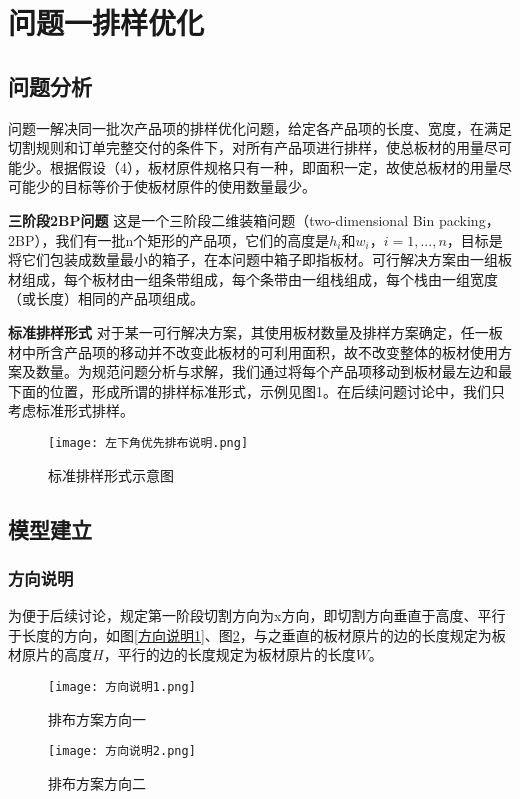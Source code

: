 \documentclass[bwprint]{gmcmthesis}
\begin{document}
\section{问题一排样优化}

\subsection{问题分析}

问题一解决同一批次产品项的排样优化问题，给定各产品项的长度、宽度，在满足切割规则和订单完整交付的条件下，对所有产品项进行排样，使总板材的用量尽可能少。根据假设（4），板材原件规格只有一种，即面积一定，故使总板材的用量尽可能少的目标等价于使板材原件的使用数量最少。

\textbf{三阶段2BP问题} \quad 这是一个三阶段二维装箱问题（two-dimensional  {\rm Bin} packing，2BP），我们有一批n个矩形的产品项，它们的高度是$h_i$和$w_i$，$i=1,...,n$，目标是将它们包装成数量最小的箱子，在本问题中箱子即指板材。可行解决方案由一组板材组成，每个板材由一组条带组成，每个条带由一组栈组成，每个栈由一组宽度（或长度）相同的产品项组成。

\textbf{标准排样形式} \quad 对于某一可行解决方案，其使用板材数量及排样方案确定，任一板材中所含产品项的移动并不改变此板材的可利用面积，故不改变整体的板材使用方案及数量。为规范问题分析与求解，我们通过将每个产品项移动到板材最左边和最下面的位置，形成所谓的排样标准形式，示例见图1。在后续问题讨论中，我们只考虑标准形式排样。

\begin{figure}[!htbp]
    \centering
        \texttt{[image: 左下角优先排布说明.png]}
        \caption{标准排样形式示意图} \label{左下角优先排布说明}
\end{figure}


\subsection{模型建立}

\subsubsection{方向说明}
为便于后续讨论，规定第一阶段切割方向为x方向，即切割方向垂直于高度、平行于长度的方向，如图\ref{方向说明1}、图\ref{方向说明2}，与之垂直的板材原片的边的长度规定为板材原片的高度$H$，平行的边的长度规定为板材原片的长度$W$。
\begin{figure}[!htbp]
    \centering
    \begin{minipage}{0.48\linewidth}
        \centering
        \texttt{[image: 方向说明1.png]}
        \caption{排布方案方向一}\label{方向说明1}
    \end{minipage}
    \begin{minipage}{0.48\linewidth}
        \centering
        \texttt{[image: 方向说明2.png]}
        \caption{排布方案方向二}\label{方向说明2}
    \end{minipage}
\end{figure}
\end{document}
